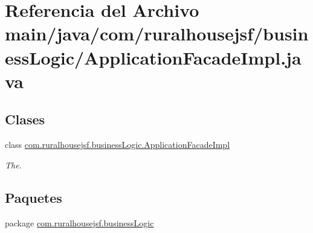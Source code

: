 \hypertarget{a00005}{}\section{Referencia del Archivo main/java/com/ruralhousejsf/business\+Logic/\+Application\+Facade\+Impl.java}
\label{a00005}
\subsection*{Clases}
\begin{DoxyCompactItemize}
\item 
class \mbox{\hyperlink{a00132}{com.\+ruralhousejsf.\+business\+Logic.\+Application\+Facade\+Impl}}
\begin{DoxyCompactList}\small\item\em The. \end{DoxyCompactList}\end{DoxyCompactItemize}
\subsection*{Paquetes}
\begin{DoxyCompactItemize}
\item 
package \mbox{\hyperlink{a00108}{com.\+ruralhousejsf.\+business\+Logic}}
\end{DoxyCompactItemize}
